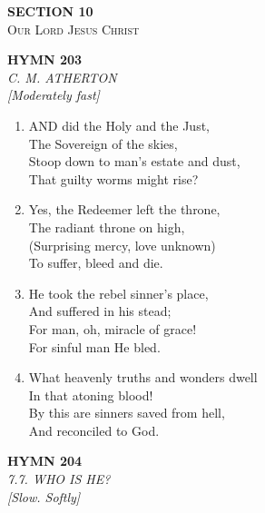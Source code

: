 \newpage
\thispagestyle{empty}
\vspace*{3.5cm}
\begin{center}
    {\LARGE \textbf{SECTION 10}}\\[0.8em]
    {\Large \textsc{Our Lord Jesus Christ}}
\end{center}
\vspace{3.5cm}

\newpage
\begin{center}
    {\Large \textbf{HYMN 203}}
    \\
    \textit{C. M. ATHERTON}
    \\
    \textit{\small [Moderately fast]}
\end{center}
\vspace{1em}

\begin{enumerate}
    \item AND did the Holy and the Just, \\
        The Sovereign of the skies, \\
        Stoop down to man's estate and dust, \\
        That guilty worms might rise?

    \item Yes, the Redeemer left the throne, \\
        The radiant throne on high, \\
        (Surprising mercy, love unknown) \\
        To suffer, bleed and die.

    \item He took the rebel sinner's place, \\
        And suffered in his stead; \\
        For man, oh, miracle of grace! \\
        For sinful man He bled.

    \item What heavenly truths and wonders dwell \\
        In that atoning blood! \\
        By this are sinners saved from hell, \\
        And reconciled to God.

\end{enumerate}

\newpage
\begin{center}
    {\Large \textbf{HYMN 204}}
    \\
    \textit{7.7. WHO IS HE?}
    \\
    \textit{\small [Slow. Softly]}
\end{center}
\vspace{1em}

